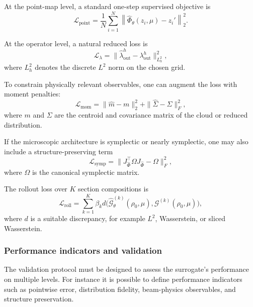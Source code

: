 \documentclass[11pt,a4paper]{article}
\begin{document}
\begin{sloppypar}
At the point-map level, a standard one-step supervised objective is
\begin{equation}
 \mathcal{L}_{\mathrm{point}}
 =
 \frac{1}{N}
 \sum_{i=1}^{N}
 \left\|
 \widehat{\Phi}_\theta(z_i,\mu)-z_i'
 \right\|_2^2.
 \label{eq:loss-point}
\end{equation}

At the operator level, a natural reduced loss is
\begin{equation}
 \mathcal{L}_{\lambda}
 =
 \|\widehat{\lambda}_{\mathrm{out}}^h - \lambda_{\mathrm{out}}^h\|_{L^2_h}^2,
 \label{eq:loss-density}
\end{equation}
where $L^2_h$ denotes the discrete $L^2$ norm on the chosen grid.

To constrain physically relevant observables, one can augment the loss with moment penalties:
\begin{equation}
 \mathcal{L}_{\mathrm{mom}}
 =
 \|\widehat{m}-m\|_2^2
 + \|\widehat{\Sigma}-\Sigma\|_F^2,
 \label{eq:loss-moments}
\end{equation}
where $m$ and $\Sigma$ are the centroid and covariance matrix of the cloud or reduced distribution.

If the microscopic architecture is symplectic or nearly symplectic, one may also include a structure-preserving term
\begin{equation}
 \mathcal{L}_{\mathrm{symp}}
 =
 \|J_{\widehat{\Phi}}^\top \Omega J_{\widehat{\Phi}} - \Omega\|_F^2,
 \label{eq:loss-symplectic}
\end{equation}
where $\Omega$ is the canonical symplectic matrix.

The rollout loss over $K$ section compositions is
\begin{equation}
 \mathcal{L}_{\mathrm{roll}}
 =
 \sum_{k=1}^{K}
 \beta_k
d\big(
 \widehat{\mathcal{G}}_\theta^{(k)}(\rho_0,\mu),
 \mathcal{G}^{(k)}(\rho_0,\mu)
 \big),
 \label{eq:loss-rollout}
\end{equation}
where $d$ is a suitable discrepancy, for example $L^2$, Wasserstein, or sliced Wasserstein.

\subsubsection{Performance indicators and validation}
\label{subsubsec:kpis-validation}

The validation protocol must be designed to assess the surrogate's performance on multiple levels. For instance it is possible to define performance indicators such as pointwise error, distribution fidelity, beam-physics observables, and structure preservation.


\end{sloppypar}
\end{document}

